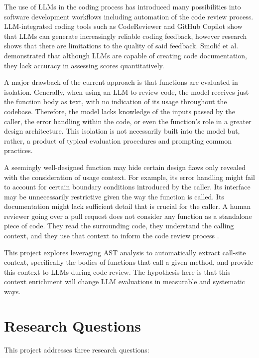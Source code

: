 \documentclass[12pt]{report}
\begin{document}
The use of LLMs in the coding process has introduced many possibilities into software development workflows including automation of the code review process. LLM-integrated coding tools such as CodeReviewer \cite{li2022codereviewer} and GitHub Copilot \cite{chen2021codex} show that LLMs can generate increasingly reliable coding feedback, however research shows that there are limitations to the quality of said feedback. Smoli\'{c} et al. \cite{Smolic2024MIPRO} demonstrated that although LLMs are capable of creating code documentation, they lack accuracy in assessing scores quantitatively.

A major drawback of the current approach is that functions are evaluated in isolation. Generally, when using an LLM to review code, the model receives just the function body as text, with no indication of its usage throughout the codebase. Therefore, the model lacks knowledge of the inputs passed by the caller, the error handling within the code, or even the function's role in a greater design architecture. This isolation is not necessarily built into the model but, rather, a product of typical evaluation procedures and prompting common practices.

A seemingly well-designed function may hide certain design flaws only revealed with the consideration of usage context. For example, its error handling might fail to account for certain boundary conditions introduced by the caller. Its interface may be unnecessarily restrictive given the way the function is called. Its documentation might lack sufficient detail that is crucial for the caller. A human reviewer going over a pull request does not consider any function as a standalone piece of code. They read the surrounding code, they understand the calling context, and they use that context to inform the code review process \cite{bacchelli2013expectations}.

This project explores leveraging AST analysis to automatically extract call-site context, specifically the bodies of functions that call a given method, and provide this context to LLMs during code review. The hypothesis here is that this context enrichment will change LLM evaluations in measurable and systematic ways.

\section{Research Questions}

This project addresses three research questions:
\end{document}
